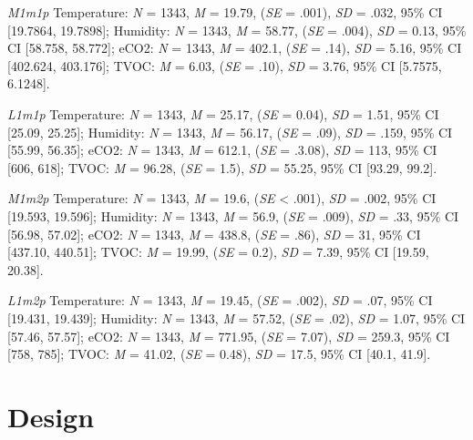 \documentclass{ueacmpstyle}
\begin{document}
        \textit{M1m1p} Temperature: \textit{N} = 1343, \textit{M} = 19.79, (\textit{SE} = .001), \textit{SD} = .032, 95\% CI [19.7864, 19.7898]; Humidity: \textit{N} = 1343, \textit{M} = 58.77, (\textit{SE} = .004), \textit{SD} = 0.13, 95\% CI [58.758, 58.772]; eCO2: \textit{N} = 1343, \textit{M} = 402.1, (\textit{SE} = .14), \textit{SD} = 5.16, 95\% CI [402.624, 403.176]; TVOC: \textit{M} = 6.03, (\textit{SE} = .10), \textit{SD} = 3.76, 95\% CI [5.7575, 6.1248].
    
        \textit{L1m1p} Temperature: \textit{N} = 1343, \textit{M} = 25.17, (\textit{SE} = 0.04), \textit{SD} = 1.51, 95\% CI [25.09, 25.25]; Humidity: \textit{N} = 1343, \textit{M} = 56.17, (\textit{SE} = .09), \textit{SD} = .159, 95\% CI [55.99, 56.35]; eCO2: \textit{N} = 1343, \textit{M} = 612.1, (\textit{SE} = .3.08), \textit{SD} = 113, 95\% CI [606, 618]; TVOC: \textit{M} = 96.28, (\textit{SE} = 1.5), \textit{SD} = 55.25, 95\% CI [93.29, 99.2].
        
        \textit{M1m2p} Temperature: \textit{N} = 1343, \textit{M} = 19.6, (\textit{SE} < .001), \textit{SD} = .002, 95\% CI [19.593, 19.596]; Humidity: \textit{N} = 1343, \textit{M} = 56.9, (\textit{SE} = .009), \textit{SD} = .33, 95\% CI [56.98, 57.02]; eCO2: \textit{N} = 1343, \textit{M} = 438.8, (\textit{SE} = .86), \textit{SD} = 31, 95\% CI [437.10, 440.51]; TVOC: \textit{M} = 19.99, (\textit{SE} = 0.2), \textit{SD} = 7.39, 95\% CI [19.59, 20.38].
        
        \textit{L1m2p} Temperature: \textit{N} = 1343, \textit{M} = 19.45, (\textit{SE} = .002), \textit{SD} = .07, 95\% CI [19.431, 19.439]; Humidity: \textit{N} = 1343, \textit{M} = 57.52, (\textit{SE} = .02), \textit{SD} = 1.07, 95\% CI [57.46, 57.57]; eCO2: \textit{N} = 1343, \textit{M} = 771.95, (\textit{SE} = 7.07), \textit{SD} = 259.3, 95\% CI [758, 785]; TVOC: \textit{M} = 41.02, (\textit{SE} = 0.48), \textit{SD} = 17.5, 95\% CI [40.1, 41.9].
        
        
        \newpage
        \section{Design}\label{app:design}
\end{document}
